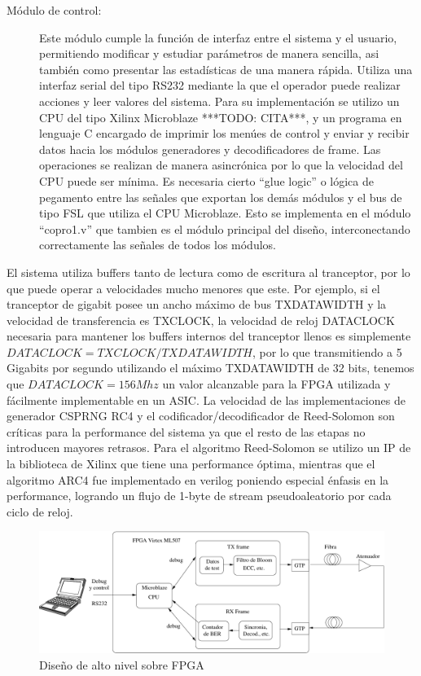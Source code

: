 \begin{description}
 \item[Módulo de control:] Este módulo cumple la función de interfaz entre el sistema y el usuario, permitiendo modificar y estudiar parámetros de manera sencilla, asi también como presentar las estadísticas de una manera rápida. Utiliza una interfaz serial del tipo RS232 mediante la que el operador puede realizar acciones y leer valores del sistema. Para su implementación se utilizo un CPU del tipo Xilinx Microblaze ***TODO: CITA***, y un programa en lenguaje C encargado de imprimir los menúes de control y enviar y recibir datos hacia los módulos generadores y decodificadores de frame. Las operaciones se realizan de manera asincrónica por lo que la velocidad del CPU puede ser mínima. Es necesaria cierto ``glue logic'' o lógica de pegamento entre las señales que exportan los demás módulos y el bus de tipo FSL que utiliza el CPU Microblaze. Esto se implementa en el módulo ``copro1.v'' que tambien es el módulo principal del diseño, interconectando correctamente las señales de todos los módulos.
\end{description}

El sistema utiliza buffers tanto de lectura como de escritura al tranceptor, por lo que puede operar a velocidades mucho menores que este. Por ejemplo, si el tranceptor de gigabit posee un ancho máximo de bus TXDATAWIDTH y la velocidad de transferencia es TXCLOCK, la velocidad de reloj DATACLOCK necesaria para mantener los buffers internos del tranceptor llenos es simplemente $DATACLOCK=TXCLOCK/TXDATAWIDTH$, por lo que transmitiendo a 5 Gigabits por segundo utilizando el máximo TXDATAWIDTH de 32 bits, tenemos que $DATACLOCK=156Mhz$ un valor alcanzable para la FPGA utilizada y fácilmente implementable en un ASIC.
La velocidad de las implementaciones de generador CSPRNG RC4 y el codificador/decodificador de Reed-Solomon son críticas para la performance del sistema ya que el resto de las etapas no introducen mayores retrasos. Para el algoritmo Reed-Solomon se utilizo un IP de la biblioteca de Xilinx que tiene una performance óptima, mientras que el algoritmo ARC4 fue implementado en verilog poniendo especial énfasis en la performance, logrando un flujo de 1-byte de stream pseudoaleatorio por cada ciclo de reloj.

\begin{figure}[t]
  \centering
    \includegraphics[width=6in]{graphs/fpgadesign.pdf}
\caption {Diseño de alto nivel sobre FPGA}
\label{fig:fpgadesign}
\end{figure}

